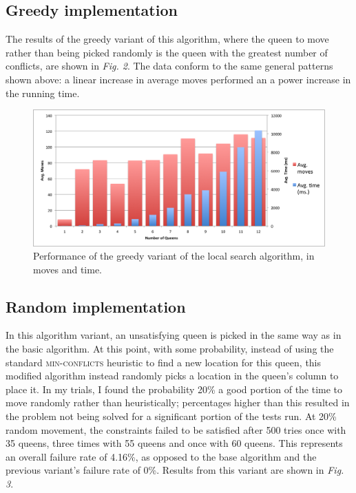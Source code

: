 \documentclass{article}
\begin{document}
\begin{doublespace}
\subsection{Greedy implementation}
The results of the greedy variant of this algorithm, where the queen to move rather than being picked randomly is the queen with the greatest number of conflicts, are shown in \textit{Fig. 2}. The data conform to the same general patterns shown above: a linear increase in average moves performed an a power increase in the running time.

\begin{figure}[ht!]
\centering
\includegraphics[width=6.5in]{./greedy.png}
\caption{Performance of the greedy variant of the local search algorithm, in moves and time.}
\end{figure}


\subsection{Random implementation}
In this algorithm variant, an unsatisfying queen is picked in the same way as in the basic algorithm. At this point, with some probability, instead of using the standard \textsc{min-conflicts} heuristic to find a new location for this queen, this modified algorithm instead randomly picks a location in the queen's column to place it. In my trials, I found the probability 20\% a good portion of the time to move randomly rather than heuristically; percentages higher than this resulted in the problem not being solved for a significant portion of the tests run. At 20\% random movement, the constraints failed to be satisfied after 500 tries once with 35 queens, three times with 55 queens and once with 60 queens. This represents an overall failure rate of 4.16\%, as opposed to the base algorithm and the previous variant's failure rate of 0\%. Results from this variant are shown in \textit{Fig. 3}.


\end{doublespace}
\end{document}
